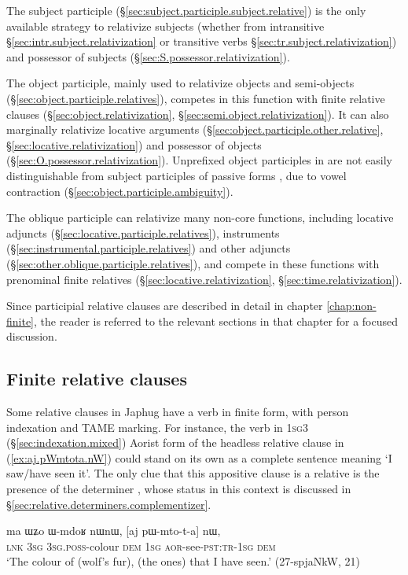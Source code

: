 The subject participle (§\ref{sec:subject.participle.subject.relative}) is the only available strategy to relativize subjects (whether from intransitive §\ref{sec:intr.subject.relativization} or transitive verbs §\ref{sec:tr.subject.relativization}) and possessor of subjects (§\ref{sec:S.possessor.relativization}).

The object participle, mainly used to relativize objects and semi-objects (§\ref{sec:object.participle.relatives}), competes in this function with finite relative clauses (§\ref {sec:object.relativization}, §\ref{sec:semi.object.relativization}). It can also marginally relativize locative arguments (§\ref{sec:object.participle.other.relative}, §\ref{sec:locative.relativization}) and possessor of objects (§\ref{sec:O.possessor.relativization}). Unprefixed object participles in  are not easily distinguishable from subject participles of passive forms , due to vowel contraction (§\ref{sec:object.participle.ambiguity}).
 
The oblique participle can relativize many non-core functions, including locative adjuncts (§\ref{sec:locative.participle.relatives}), instruments (§\ref{sec:instrumental.participle.relatives}) and other adjuncts (§\ref{sec:other.oblique.participle.relatives}), and compete in these functions with prenominal finite relatives (§\ref{sec:locative.relativization}, §\ref{sec:time.relativization}).
 
Since participial relative clauses are described in detail in chapter \ref{chap:non-finite}, the reader is referred to the relevant sections in that chapter for a focused discussion.
 
\subsection{Finite relative clauses} \label{sec:finite.relatives}
Some relative clauses in Japhug have a verb in finite form, with person indexation and TAME marking. For instance, the verb  in \textsc{1sg}\fl{}3 (§\ref{sec:indexation.mixed}) Aorist form of the headless relative clause in (\ref{ex:aj.pWmtota.nW}) could stand on its own as a complete sentence meaning `I saw/have seen it'. The only clue that this appositive clause is a relative is the presence of the determiner , whose status in this context is discussed in §\ref{sec:relative.determiners.complementizer}.

\begin{exe}
\ex \label{ex:aj.pWmtota.nW}
 \gll ma ɯʑo ɯ-mdoʁ nɯnɯ, [aj pɯ-mto-t-a] nɯ, \\
 \textsc{lnk} \textsc{3sg} \textsc{3sg}.\textsc{poss}-colour \textsc{dem} \textsc{1sg} \textsc{aor}-see-\textsc{pst}:\textsc{tr}-\textsc{1sg} \textsc{dem} \\
 \glt `The colour of (wolf's fur), (the ones) that I have seen.' (27-spjaNkW, 21)
\end{exe}

